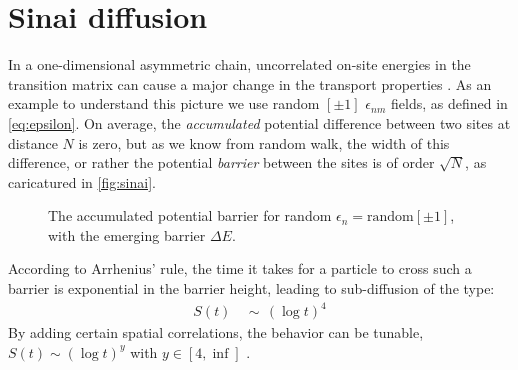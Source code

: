 \section{Sinai diffusion}\label{sec:sinai}


In a one-dimensional asymmetric chain, uncorrelated on-site
energies in the transition matrix
can cause a major change in the 
transport properties \cite{sinai_limiting_1983,bouchaud_anomalous_1990}.
As an example to understand this picture we use random $[\pm 1]$ $\epsilon_{nm}$ fields,
as defined in \autoref{eq:epsilon}. 
On average, the \emph{accumulated} potential difference 
between two sites at distance $N$ is zero, but as we know 
from random walk, the width of this difference, or rather 
the potential \emph{barrier} between the sites is of order $\sqrt{N}$, as 
caricatured in \autoref{fig:sinai}.


\begin{comment}
import numpy as np
rand_E = (np.random.rand_integers(1,size=100)*2-1).cumsum()
pairs = [ "({0},{1})".format(n,E) for n,E in enumerate(rand_E)]
print("{"+ "".join(pairs)+"};")
print("\n  min,max: {0:.2f},{1:.2f}".format(rand_E.min(), rand_E.max()))
\end{comment} 

\begin{figure}
\caption{The accumulated potential barrier for random $\epsilon_n = \textrm{random}[\pm 1]$, with the 
     emerging barrier $\Delta E$.}
     \label{fig:sinai}
\end{figure}


According to Arrhenius' rule, the time it takes for a particle to cross
such a barrier is exponential in the barrier height, leading to sub-diffusion
of the type:
\begin{align}
S(t)\ \ &\sim\ \  (\log t)^4
\end{align}
By adding certain spatial correlations, the behavior can be tunable, 
$S(t) \sim (\log t)^y$ with $y \in [4,\inf]$ \cite{stanley_generalisation_1987}.


